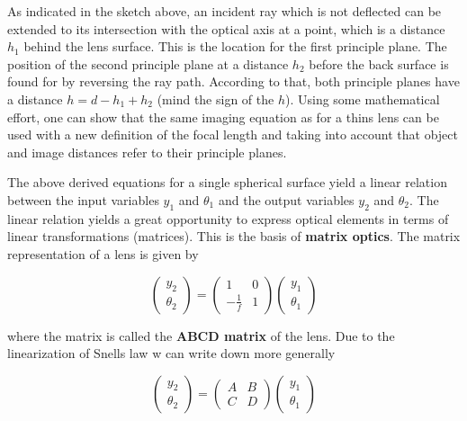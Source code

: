 \documentclass[
  a4paper,
]{book}
\begin{document}
As indicated in the sketch above, an incident ray which is not deflected
can be extended to its intersection with the optical axis at a point,
which is a distance \(h_1\) behind the lens surface. This is the
location for the first principle plane. The position of the second
principle plane at a distance \(h_2\) before the back surface is found
for by reversing the ray path. According to that, both principle planes
have a distance \(h=d-h_1+h_2\) (mind the sign of the \(h\)). Using some
mathematical effort, one can show that the same imaging equation as for
a thins lens can be used with a new definition of the focal length and
taking into account that object and image distances refer to their
principle planes.

\newpage

\begin{tcolorbox}[enhanced jigsaw, coltitle=black, title=\textcolor{quarto-callout-note-color}{\faInfo}\hspace{0.5em}{Matrix Optics}, colframe=quarto-callout-note-color-frame, toprule=.15mm, opacitybacktitle=0.6, left=2mm, opacityback=0, breakable, toptitle=1mm, bottomtitle=1mm, leftrule=.75mm, arc=.35mm, titlerule=0mm, colbacktitle=quarto-callout-note-color!10!white, rightrule=.15mm, bottomrule=.15mm, colback=white]

The above derived equations for a single spherical surface yield a
linear relation between the input variables \(y_1\) and \(\theta_1\) and
the output variables \(y_2\) and \(\theta_2\). The linear relation
yields a great opportunity to express optical elements in terms of
linear transformations (matrices). This is the basis of \textbf{matrix
optics}. The matrix representation of a lens is given by

\[\begin{pmatrix} y_2 \\ \theta_2 \end{pmatrix} = \begin{pmatrix} 1 & 0 \\ -\frac{1}{f} & 1 \end{pmatrix} \begin{pmatrix} y_1 \\ \theta_1 \end{pmatrix}\]

where the matrix is called the \textbf{ABCD matrix} of the lens. Due to
the linearization of Snells law w can write down more generally

\[\begin{pmatrix} y_2 \\
\theta_2 \end{pmatrix} = \begin{pmatrix} A & B \\ C & D \end{pmatrix} \begin{pmatrix} y_1 \\ \theta_1 \end{pmatrix}\]


\end{tcolorbox}
\end{document}
